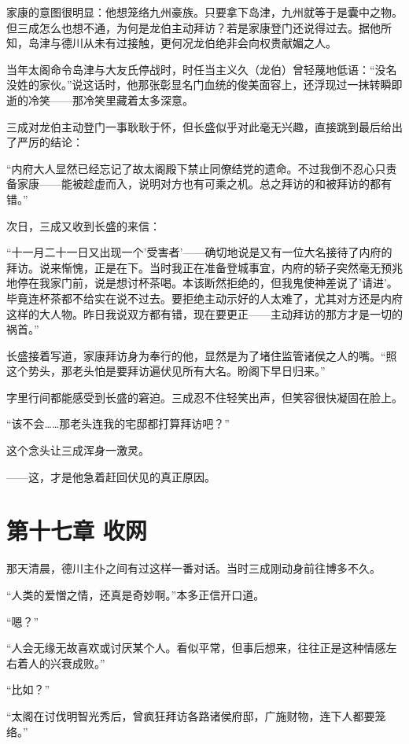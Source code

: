 \documentclass[
]{book}
\begin{document}
家康的意图很明显：他想笼络九州豪族。只要拿下岛津，九州就等于是囊中之物。但三成怎么也想不通，为何是龙伯主动拜访？若是家康登门还说得过去。据他所知，岛津与德川从未有过接触，更何况龙伯绝非会向权贵献媚之人。

当年太阁命令岛津与大友氏停战时，时任当主义久（龙伯）曾轻蔑地低语：``没名没姓的家伙。''说这话时，他那张彰显名门血统的俊美面容上，还浮现过一抹转瞬即逝的冷笑------那冷笑里藏着太多深意。

三成对龙伯主动登门一事耿耿于怀，但长盛似乎对此毫无兴趣，直接跳到最后给出了严厉的结论：

``内府大人显然已经忘记了故太阁殿下禁止同僚结党的遗命。不过我倒不忍心只责备家康------能被趁虚而入，说明对方也有可乘之机。总之拜访的和被拜访的都有错。''

次日，三成又收到长盛的来信：

``十一月二十一日又出现一个'受害者'------确切地说是又有一位大名接待了内府的拜访。说来惭愧，正是在下。当时我正在准备登城事宜，内府的轿子突然毫无预兆地停在我家门前，说是想讨杯茶喝。本该断然拒绝的，但我鬼使神差说了'请进'。毕竟连杯茶都不给实在说不过去。要拒绝主动示好的人太难了，尤其对方还是内府这样的大人物。昨日我说双方都有错，现在要更正------主动拜访的那方才是一切的祸首。''

长盛接着写道，家康拜访身为奉行的他，显然是为了堵住监管诸侯之人的嘴。``照这个势头，那老头怕是要拜访遍伏见所有大名。盼阁下早日归来。''

字里行间都能感受到长盛的窘迫。三成忍不住轻笑出声，但笑容很快凝固在脸上。

``该不会\ldots\ldots 那老头连我的宅邸都打算拜访吧？''

这个念头让三成浑身一激灵。

------这，才是他急着赶回伏见的真正原因。

\chapter*{第十七章 收网}\label{ux7b2cux5341ux4e03ux7ae0-ux6536ux7f51}

那天清晨，德川主仆之间有过这样一番对话。当时三成刚动身前往博多不久。

``人类的爱憎之情，还真是奇妙啊。''本多正信开口道。

``嗯？''

``人会无缘无故喜欢或讨厌某个人。看似平常，但事后想来，往往正是这种情感左右着人的兴衰成败。''

``比如？''

``太阁在讨伐明智光秀后，曾疯狂拜访各路诸侯府邸，广施财物，连下人都要笼络。''
\end{document}

